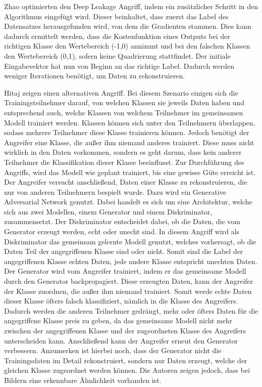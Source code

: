 Zhao \etal \cite{P-19} optimierten den Deep Leakage Angriff, indem ein zusätzlicher Schritt in den Algorithmus eingefügt wird.
Dieser beinhaltet, dass zuerst das Label des Datensatzes herausgefunden wird, von dem die Gradienten stammen.
Dies kann dadurch ermittelt werden, dass die Kostenfunktion eines Outputs bei der richtigen Klasse den Wertebereich (-1,0) annimmt und bei den falschen Klassen den Wertebereich (0,1), sofern keine Quadrierung stattfindet.
Der initiale Eingabevektor hat nun von Beginn an das richtige Label. 
Dadurch werden weniger Iterationen benötigt, um Daten zu rekonstruieren.


Hitaj \etal \cite{P-81} zeigen einen alternativen Angriff.
Bei diesem Szenario einigen sich die Trainingsteilnehmer darauf, von welchen Klassen sie jeweils Daten haben und entsprechend auch, welche Klassen von welchem Teilnehmer im gemeinsamen Modell trainiert werden.
Klassen können sich unter den Teilnehmern überlappen, sodass mehrere Teilnehmer diese Klasse trainieren können.
Jedoch benötigt der Angreifer eine Klasse, die außer ihm niemand anderes trainiert.
Diese muss nicht wirklich in den Daten vorkommen, sondern es geht darum, dass kein anderer Teilnehmer die Klassifikation dieser Klasse beeinflusst.
Zur Durchführung des Angriffs, wird das Modell wie geplant trainiert, bis eine gewisse Güte erreicht ist.
Der Angreifer versucht anschließend, Daten einer Klasse zu rekonstruieren, die nur von anderen Teilnehmern bespielt wurde.
Dazu wird ein Generative Adversarial Network \cite{P-86} genutzt.
Dabei handelt es sich um eine Architektur, welche sich aus zwei Modellen, einem Generator und einem Diskriminator, zusammensetzt.
Der Diskriminator entscheidet dabei, ob die Daten, die vom Generator erzeugt werden, echt oder unecht sind. 
In diesem Angriff wird als Diskriminator das gemeinsam gelernte Modell genutzt, welches vorhersagt, ob die Daten Teil der angegriffenen Klasse sind oder nicht.
Somit sind die Label der angegriffenen Klasse echten Daten, jede andere Klasse entspricht unechten Daten.
Der Generator wird vom Angreifer trainiert, indem er das gemeinsame Modell durch den Generator backpropagiert.
Diese erzeugten Daten, kann der Angreifer der Klasse zuordnen, die außer ihm niemand trainiert. 
Somit werde echte Daten dieser Klasse öfters falsch klassifiziert, nämlich in die Klasse des Angreifers.
Dadurch werden die anderen Teilnehmer gedrängt, mehr oder öfters Daten für die angegriffene Klasse preis zu geben, da das gemeinsame Modell nicht mehr zwischen der angegriffenen Klasse und der zugeordneten Klasse des Angreifers unterscheiden kann.
Anschließend kann der Angreifer erneut den Generator verbessern.
Anzumerken ist hierbei noch, dass der Generator nicht die Trainingsdaten im Detail rekonstruiert, sondern nur Daten erzeugt, welche der gleichen Klasse zugeordnet werden können.
Die Autoren zeigen jedoch, dass bei Bildern eine erkennbare Ähnlichkeit vorhanden ist.
